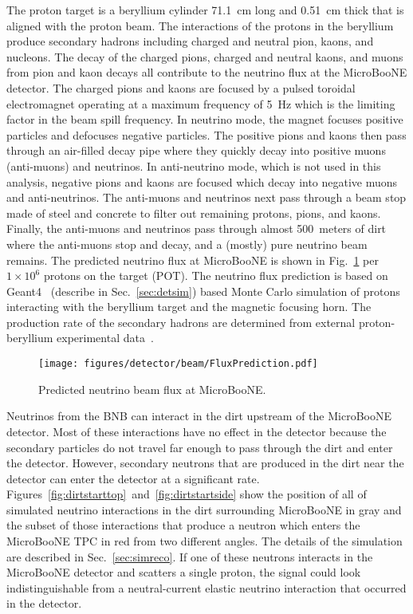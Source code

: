   The proton target is a beryllium cylinder 71.1~cm long and 0.51~cm thick that
  is aligned with the proton beam. The interactions of the protons in the
  beryllium produce secondary hadrons including charged and neutral pion,
  kaons, and nucleons. The decay of the charged pions, charged and neutral
  kaons, and muons from pion and kaon decays all contribute to the neutrino
  flux at the MicroBooNE detector. The charged pions and kaons are focused by a
  pulsed toroidal electromagnet operating at a maximum frequency of 5~Hz which
  is the limiting factor in the beam spill frequency. In neutrino mode, the
  magnet focuses positive particles and defocuses negative particles.  The
  positive pions and kaons then pass through an air-filled decay pipe where
  they quickly decay into positive muons (anti-muons) and neutrinos. In
  anti-neutrino mode, which is not used in this analysis, negative pions and
  kaons are focused which decay into negative muons and anti-neutrinos. The
  anti-muons and neutrinos next pass through a beam stop made of steel and
  concrete to filter out remaining protons, pions, and kaons.  Finally, the
  anti-muons and neutrinos pass through almost 500~meters of dirt where the
  anti-muons stop and decay, and a (mostly) pure neutrino beam remains.  The
  predicted neutrino flux at MicroBooNE is shown in Fig.~\ref{fig:beamflux} per
  $1\times 10^6$ protons on the target (POT). The neutrino flux prediction is
  based on Geant4~\cite{Agostinelli:2002hh} (describe in Sec.~\ref{sec:detsim})
  based Monte Carlo simulation of protons interacting with the beryllium target
  and the magnetic focusing horn. The production rate of the secondary hadrons
  are determined from external proton-beryllium experimental
  data~\cite{Catanesi:2007ab}.

  \begin{figure}[h]
    \centering
    \texttt{[image: figures/detector/beam/FluxPrediction.pdf]}
    \caption{Predicted neutrino beam flux at MicroBooNE.}
    \label{fig:beamflux}
  \end{figure}

  Neutrinos from the BNB can interact in the dirt upstream of the MicroBooNE
  detector. Most of these interactions have no effect in the detector because
  the secondary particles do not travel far enough to pass through the dirt and
  enter the detector. However, secondary neutrons that are produced in the dirt
  near the detector can enter the detector at a significant rate.
  Figures~\ref{fig:dirtstarttop}~and~\ref{fig:dirtstartside} show the position
  of all of simulated neutrino interactions in the dirt surrounding MicroBooNE
  in gray and the subset of those interactions that produce a neutron which
  enters the MicroBooNE TPC in red from two different angles. The details of
  the simulation are described in Sec.~\ref{sec:simreco}. If one of these
  neutrons interacts in the MicroBooNE detector and scatters a single proton,
  the signal could look indistinguishable from a neutral-current elastic
  neutrino interaction that occurred in the detector.

